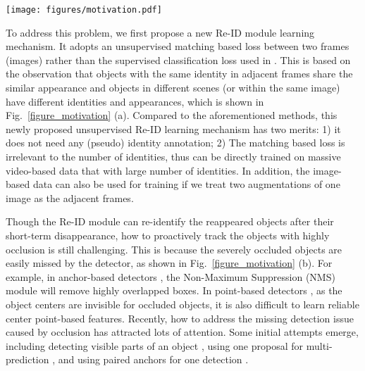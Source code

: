 \documentclass[final,1p,times,twocolumn]{elsarticle}
\newcommand{\Sref}[1]{Section~\ref{#1}}
\newcommand{\fref}[1]{Fig.~\ref{#1}}
\begin{document}
	\begin{figure*}[t]
		 \texttt{[image: figures/motivation.pdf]} 
		\caption{(a) The left and right are two adjacent frames from a video while the middle is an image from another scene. An apparent observation is that objects with the same identity in adjacent frames share the similar appearance and objects in different scenes (or within the same image) have different identities and appearances. (b): The left and right are tracking results in previous and current frames, and the middle are the detected objects and occlusion centers in current frame. Some lost objects that are missed by detector can be tracked with the help of predicted occlusion centers. Please refer to \Sref{section_lost_object_refinding} for more details about lost objects refinding.
		}
		\label{figure_motivation}
	\end{figure*}
	
	
	To address this problem, we first propose a new Re-ID module learning mechanism. It adopts an unsupervised matching based loss between two frames (images)
rather than the supervised classification loss used in \cite{zhu2018online, wang2019towards, zhang2020fairmot}. 
	This is based on the observation that objects with the same identity in adjacent frames share the similar appearance and objects in different scenes (or within the same image) have different identities and appearances,
	which is shown in \fref{figure_motivation} (a). Compared to the aforementioned methods, this newly proposed unsupervised Re-ID learning mechanism has two merits: 1) it does not need any (pseudo) identity annotation; 2) The matching based loss is irrelevant to the number of identities, thus can be directly trained on massive video-based data that with large number of identities.
	In addition, the image-based data can also be used for training if we treat two augmentations of one image as the adjacent frames.
	
	Though the Re-ID module can re-identify the reappeared objects after their short-term disappearance, how to proactively track the objects with highly occlusion is still challenging. This is because the severely occluded objects are easily missed by the detector, as shown in \fref{figure_motivation} (b). For example, in anchor-based detectors \cite{ren2016faster, he2017mask},  the Non-Maximum Suppression (NMS) module will remove highly overlapped boxes. In point-based detectors \cite{law2018cornernet, zhou2019objects}, as the object centers are invisible for occluded objects, it is also difficult to learn reliable center point-based features. Recently, how to address the missing detection issue caused by occlusion has attracted lots of attention. Some initial attempts \cite{zhu2018online, chi2020pedhunter, chu2020detection, zhu2020crowded} emerge, including detecting visible parts of an object \cite{zhu2018online, chi2020pedhunter}, using one proposal for multi-prediction \cite{chu2020detection}, and using paired anchors for one detection \cite{zhu2020crowded}. 	
	
\end{document}
